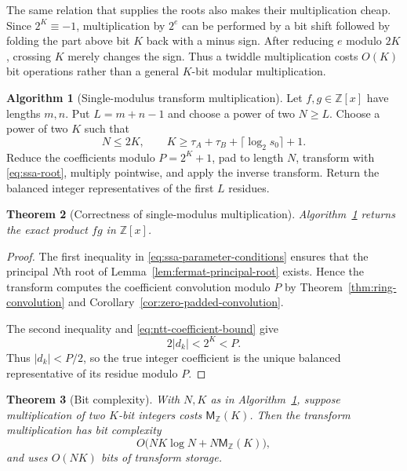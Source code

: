 \documentclass[11pt]{book}
\newtheorem{theorem}{Theorem}[section]
\theoremstyle{definition}
\newtheorem{algorithm}[theorem]{Algorithm}
\newcommand{\ZZ}{\mathbb Z}
\newcommand{\MZ}{\mathsf M_{\ZZ}}
\begin{document}
The same relation that supplies the roots also makes their multiplication
cheap.  Since $2^K\equiv-1$, multiplication by $2^e$ can be performed by a
bit shift followed by folding the part above bit $K$ back with a minus sign.
After reducing $e$ modulo $2K$, crossing $K$ merely changes the sign.  Thus a
twiddle multiplication costs $O(K)$ bit operations rather than a general
$K$-bit modular multiplication.

\begin{algorithm}[Single-modulus transform multiplication]\label{alg:ssa-poly-mul}
Let $f,g\in\ZZ[x]$ have lengths $m,n$.  Put $L=m+n-1$ and choose a power of
two $N\geq L$.  Choose a power of two $K$ such that
\begin{equation}\label{eq:ssa-parameter-conditions}
 N\leq2K,
 \qquad
 K\geq\tau_A+\tau_B+\lceil\log_2s_0\rceil+1.
\end{equation}
Reduce the coefficients modulo $P=2^K+1$, pad to length $N$, transform with
\eqref{eq:ssa-root}, multiply pointwise, and apply the inverse transform.
Return the balanced integer representatives of the first $L$ residues.
\end{algorithm}

\begin{theorem}[Correctness of single-modulus multiplication]
Algorithm~\ref{alg:ssa-poly-mul} returns the exact product $fg$ in $\ZZ[x]$.
\end{theorem}

\begin{proof}
The first inequality in \eqref{eq:ssa-parameter-conditions} ensures that the
principal $N$th root of Lemma~\ref{lem:fermat-principal-root} exists.  Hence
the transform computes the coefficient convolution modulo $P$ by
Theorem~\ref{thm:ring-convolution} and
Corollary~\ref{cor:zero-padded-convolution}.

The second inequality and \eqref{eq:ntt-coefficient-bound} give
\[
 2|d_k|<2^K<P.
\]
Thus $|d_k|<P/2$, so the true integer coefficient is the unique balanced
representative of its residue modulo $P$.
\end{proof}

\begin{theorem}[Bit complexity]\label{thm:ssa-poly-complexity}
With $N,K$ as in Algorithm~\ref{alg:ssa-poly-mul}, suppose multiplication of
two $K$-bit integers costs $\MZ(K)$.  Then the transform multiplication has
bit complexity
\begin{equation}\label{eq:ssa-complexity}
 O\bigl(NK\log N+N\MZ(K)\bigr),
\end{equation}
and uses $O(NK)$ bits of transform storage.
\end{theorem}
\end{document}
